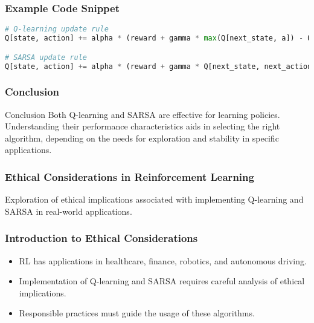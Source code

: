 \documentclass{beamer}
\begin{document}
\begin{frame}[fragile]
    \frametitle{Example Code Snippet}
    \begin{lstlisting}[language=python]
# Q-learning update rule
Q[state, action] += alpha * (reward + gamma * max(Q[next_state, a]) - Q[state, action])

# SARSA update rule
Q[state, action] += alpha * (reward + gamma * Q[next_state, next_action] - Q[state, action])
    \end{lstlisting}
\end{frame}

\begin{frame}[fragile]
    \frametitle{Conclusion}
    \begin{block}{Conclusion}
        Both Q-learning and SARSA are effective for learning policies.
        Understanding their performance characteristics aids in selecting the right algorithm,
        depending on the needs for exploration and stability in specific applications.
    \end{block}
\end{frame}

\begin{frame}[fragile]
    \frametitle{Ethical Considerations in Reinforcement Learning}
    Exploration of ethical implications associated with implementing Q-learning and SARSA in real-world applications.
\end{frame}

\begin{frame}[fragile]
    \frametitle{Introduction to Ethical Considerations}
    \begin{itemize}
        \item RL has applications in healthcare, finance, robotics, and autonomous driving.
        \item Implementation of Q-learning and SARSA requires careful analysis of ethical implications.
        \item Responsible practices must guide the usage of these algorithms.
    \end{itemize}
\end{frame}
\end{document}

